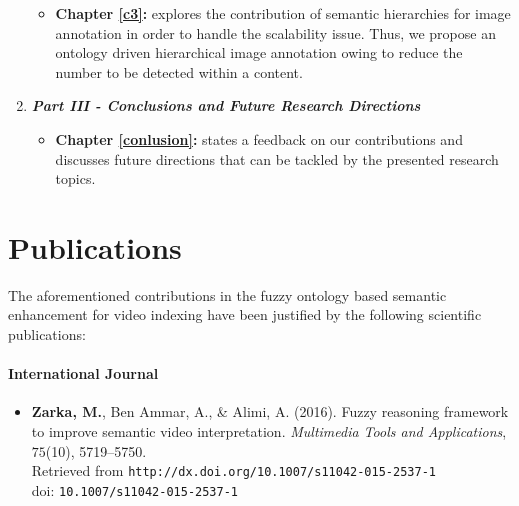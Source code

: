 \begin{enumerate}
\begin{itemize}
			\item \textbf{Chapter \ref{c3}:} explores the contribution of semantic hierarchies for image annotation 
				in order to handle the scalability issue. Thus, we propose an ontology driven hierarchical 
				image annotation owing to reduce the number  to be detected 
				within a content. 
		\end{itemize}

		\item \textit{\textbf{Part III - Conclusions and Future Research Directions}}
		\begin{itemize}
			\item \textbf{Chapter \ref{conlusion}:} states a feedback on our contributions and discusses
				future directions that can be tackled by the presented research topics.
		\end{itemize}
	\end{enumerate}

	

	\section{Publications}
	The aforementioned contributions in the fuzzy ontology based semantic enhancement for video 	
	indexing have been justified  by the following scientific publications:  
		\paragraph{International Journal}
			\begin{itemize}
				\item \textbf{Zarka, M.}, Ben Ammar, A., \&{} Alimi, A. (2016). 
				Fuzzy reasoning framework to improve semantic video interpretation. 
				\emph{Multimedia Tools and Applications}, $75$(10), 5719–5750. \\Retrieved from 
				\texttt{http://dx.doi.org/10.1007/s11042-015-2537-1}
				\\doi: \texttt{10.1007/s11042-015-2537-1}
			\end{itemize}

